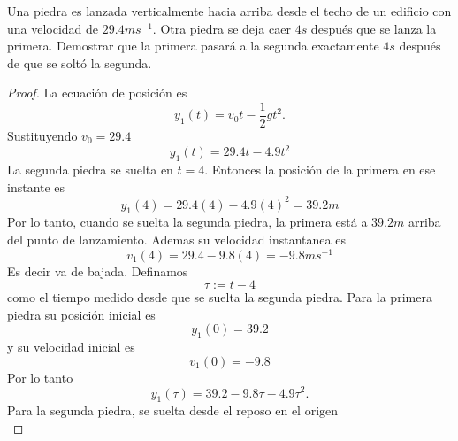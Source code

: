 \documentclass[12pt,a4paper]{article}
\begin{document}
    \begin{mdframed}[style=mdbluebox,frametitle={Ejercicio 2}]
        Una piedra es lanzada verticalmente hacia arriba desde el techo de un edificio con
        una velocidad de $29.4ms^{-1}$. Otra piedra se deja caer $4s$ después que se lanza
        la primera. Demostrar que la primera pasará a la segunda exactamente $4s$ después
        de que se soltó la segunda.
    \end{mdframed}

    \begin{proof}
        La ecuación de posición es
        \begin{equation*}
            y_{1}(t)=v_{0}t-\frac{1}{2}gt^{2}.
        \end{equation*}
        Sustituyendo $v_{0}=29.4$
        \begin{equation*}
            y_{1}(t)=29.4t-4.9t^{2}
        \end{equation*}
        La segunda piedra se suelta en $t=4$. Entonces la posición de la primera en ese
        instante es
        \begin{equation*}
            y_{1}(4)=29.4(4)-4.9(4)^{2}=39.2m
        \end{equation*}
        Por lo tanto, cuando se suelta la segunda piedra, la primera está a $39.2m$ arriba
        del punto de lanzamiento. Ademas su velocidad instantanea es
        \begin{equation*}
            v_{1}(4)=29.4-9.8(4)=-9.8ms^{-1}
        \end{equation*}
        Es decir va de bajada. Definamos
        \begin{equation*}
            \tau:=t-4
        \end{equation*}
        como el tiempo medido desde que se suelta la segunda piedra. Para la primera piedra
        su posición inicial es
        \begin{equation*}
            y_{1}(0)=39.2
        \end{equation*}
        y su velocidad inicial es
        \begin{equation*}
            v_{1}(0)=-9.8
        \end{equation*}
        Por lo tanto
        \begin{equation*}
            y_{1}(\tau)=39.2-9.8\tau-4.9\tau^{2}.
        \end{equation*}
        Para la segunda piedra, se suelta desde el reposo en el origen
        \begin{equation*}

\end{equation*}
\end{proof}
\end{document}
